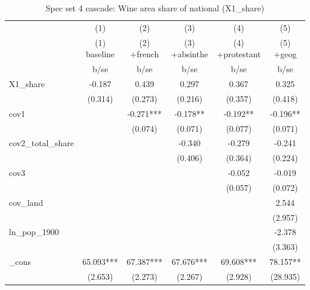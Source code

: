 \begin{table}[htbp]\centering
\def\sym#1{\ifmmode^{#1}\else\(^{#1}\)\fi}
\caption{Spec set 4 cascade: Wine area share of national (X1\_share) \label{tab:cascade4}}
\begin{tabular}{l*{5}{c}}
\toprule
            &\multicolumn{1}{c}{(1)}&\multicolumn{1}{c}{(2)}&\multicolumn{1}{c}{(3)}&\multicolumn{1}{c}{(4)}&\multicolumn{1}{c}{(5)}\\
            &\multicolumn{1}{c}{(1) baseline}&\multicolumn{1}{c}{(2) +french}&\multicolumn{1}{c}{(3) +absinthe}&\multicolumn{1}{c}{(4) +protestant}&\multicolumn{1}{c}{(5) +geog}\\
            &        b/se   &        b/se   &        b/se   &        b/se   &        b/se   \\
\midrule
X1\_share    &      -0.187   &       0.439   &       0.297   &       0.367   &       0.325   \\
            &     (0.314)   &     (0.273)   &     (0.216)   &     (0.357)   &     (0.418)   \\
cov1        &               &      -0.271***&      -0.178** &      -0.192** &      -0.196** \\
            &               &     (0.074)   &     (0.071)   &     (0.077)   &     (0.071)   \\
cov2\_total\_share&               &               &      -0.340   &      -0.279   &      -0.241   \\
            &               &               &     (0.406)   &     (0.364)   &     (0.224)   \\
cov3        &               &               &               &      -0.052   &      -0.019   \\
            &               &               &               &     (0.057)   &     (0.072)   \\
cov\_land    &               &               &               &               &       2.544   \\
            &               &               &               &               &     (2.957)   \\
ln\_pop\_1900 &               &               &               &               &      -2.378   \\
            &               &               &               &               &     (3.363)   \\
\_cons      &      65.093***&      67.387***&      67.676***&      69.608***&      78.157** \\
            &     (2.653)   &     (2.273)   &     (2.267)   &     (2.928)   &    (28.935)   \\

\end{tabular}
\end{table}
